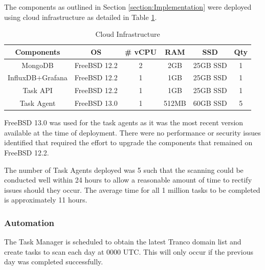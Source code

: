 \documentclass{mscreport}
\begin{document}
The components as outlined in Section \ref{section:Implementation} were deployed using cloud infrastructure as detailed in Table \ref{table:implmentation_cloud}.

\begin{table}[H]
  \begin{center}
    \begin{tabular}{|c|c|c|c|c|c|}  %
      \hline
      \textbf{Components} & \textbf{OS} & \textbf{\# vCPU} & \textbf{RAM} & \textbf{SSD} & \textbf{Qty}\\
      \hline
      MongoDB & FreeBSD 12.2 & 2 & 2GB & 25GB SSD & 1 \\
      \hline
      InfluxDB$+$Grafana & FreeBSD 12.2 & 1 & 1GB & 25GB SSD & 1 \\
      \hline
      Task API & FreeBSD 12.2 & 1 & 1GB & 25GB SSD & 1 \\
      \hline
      Task Agent & FreeBSD 13.0 & 1 & 512MB & 60GB SSD & 5 \\
      \hline
    \end{tabular}
    \caption{Cloud Infrastructure}
    \label{table:implmentation_cloud} %
  \end{center}
\end{table}

\vspace{0.3cm} \noindent
FreeBSD 13.0 was used for the task agents as it was the most recent version available at the time of deployment. There were no performance or security issues identified that required the effort to upgrade the components that remained on FreeBSD 12.2.

\vspace{0.3cm} \noindent
The number of Task Agents deployed was 5 such that the scanning could be conducted well within 24 hours to allow a reasonable amount of time to rectify issues should they occur. The average time for all 1 million tasks to be completed is approximately 11 hours.

\subsubsection{Automation}

The Task Manager is scheduled to obtain the latest Tranco domain list and create tasks to scan each day at 0000 UTC. This will only occur if the previous day was completed successfully.
\end{document}
